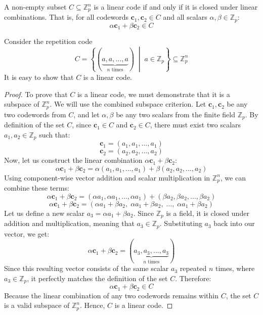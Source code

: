 \documentclass[docmute]{article}
\begin{document}
\begin{remark}
A non-empty subset $C \subseteq \mathbb{Z}_p^n$ is a linear code if and only if it is closed under linear combinations. That is, for all codewords $\mathbf{c}_1, \mathbf{c}_2 \in C$ and all scalars $\alpha, \beta \in \mathbb{Z}_p$:$$\alpha \mathbf{c}_1 + \beta \mathbf{c}_2 \in C$$
\end{remark}

\begin{example}
Consider the repetition code
$$C = \left\{ (\underbrace{a, a, \dots, a}_{n \text{ times}}) \;\middle|\; a \in \mathbb{Z}_p \right\} \subseteq \mathbb{Z}_p^n$$
It is easy to show that $C$ is a linear code.
\end{example}

\begin{proof}
To prove that $C$ is a linear code, we must demonstrate that it is a subspace of $\mathbb{Z}_p^n$.
We will use the combined subspace criterion. 
Let $\mathbf{c}_1, \mathbf{c}_2$ be any two codewords from $C$, and let $\alpha, \beta$ be any two scalars from the finite field $\mathbb{Z}_p$. 
By definition of the set $C$, since $\mathbf{c}_1 \in C$ and $\mathbf{c}_2 \in C$, there must exist two scalars $a_1, a_2 \in \mathbb{Z}_p$ such that:
$$\mathbf{c}_1 = (a_1, a_1, \dots, a_1)$$
$$\mathbf{c}_2 = (a_2, a_2, \dots, a_2)$$
Now, let us construct the linear combination $\alpha \mathbf{c}_1 + \beta \mathbf{c}_2$:
$$\alpha \mathbf{c}_1 + \beta \mathbf{c}_2 = \alpha (a_1, a_1, \dots, a_1) + \beta (a_2, a_2, \dots, a_2)
$$Using component-wise vector addition and scalar multiplication in $\mathbb{Z}_p^n$, we can combine these terms:
$$\alpha \mathbf{c}_1 + \beta \mathbf{c}_2 = (\alpha a_1, \alpha a_1, \dots, \alpha a_1) + (\beta a_2, \beta a_2, \dots, \beta a_2)$$
$$\alpha \mathbf{c}_1 + \beta \mathbf{c}_2 = (\alpha a_1 + \beta a_2, \; \alpha a_1 + \beta a_2, \; \dots, \; \alpha a_1 + \beta a_2)$$
Let us define a new scalar $a_3 = \alpha a_1 + \beta a_2$. Since $\mathbb{Z}_p$ is a field, it is closed under addition and multiplication, meaning that $a_3 \in \mathbb{Z}_p$.
Substituting $a_3$ back into our vector, we get:
$$\alpha \mathbf{c}_1 + \beta \mathbf{c}_2 = (\underbrace{a_3, a_3, \dots, a_3}_{n \text{ times}})$$
Since this resulting vector consists of the same scalar $a_3$ repeated $n$ times, where $a_3 \in \mathbb{Z}_p$, it perfectly matches the definition of the set $C$. 
Therefore:
$$\alpha \mathbf{c}_1 + \beta \mathbf{c}_2 \in C$$
Because the linear combination of any two codewords remains within $C$, the set $C$ is a valid subspace of $\mathbb{Z}_p^n$.
Hence, $C$ is a linear code.
\end{proof}
\end{document}
